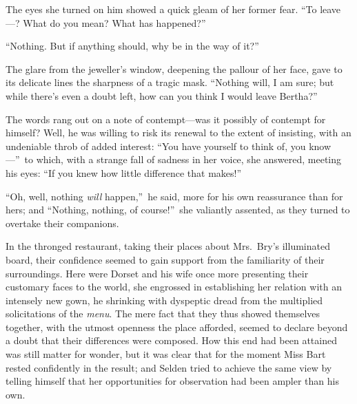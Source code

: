 \documentclass[12pt,a4paper]{book}
\begin{document}
The eyes she turned on him showed a quick gleam of her former
fear. ``To leave---? What do you mean? What has happened?''





``Nothing. But if anything should, why be in the way of it?''





The glare from the jeweller's window, deepening the pallour of
her face, gave to its delicate lines the sharpness of a tragic
mask. ``Nothing will, I am sure; but while there's even a doubt
left, how can you think I would leave Bertha?''





The words rang out on a note of contempt---was it possibly of
contempt for himself? Well, he was willing to risk its renewal to
the extent of insisting, with an undeniable throb of added
interest: ``You have yourself to think of, you know---''\ to which,
with a strange fall of sadness in her voice, she answered,
meeting his eyes: ``If you knew how little difference that makes!''





``Oh, well, nothing \textit{will} happen,''\ he said, more for his own
reassurance than for hers; and ``Nothing, nothing, of course!''\ she
valiantly assented, as they turned to overtake their companions.





In the thronged restaurant, taking their places about Mrs.\ Bry's
illuminated board, their confidence seemed to gain support from
the familiarity of their surroundings. Here were Dorset and his
wife once more presenting their customary faces to the world, she
engrossed in establishing her relation with an intensely new
gown, he shrinking with dyspeptic dread from the multiplied
solicitations of the \textit{menu}. The mere fact that they thus showed
themselves together, with the utmost openness the place afforded,
seemed to declare beyond a doubt that their differences were
composed. How this end had been attained was still matter for
wonder, but it was clear that for the moment Miss Bart rested
confidently in the result; and Selden tried to achieve the same
view by telling himself that her opportunities for observation
had been ampler than his own.
\end{document}
